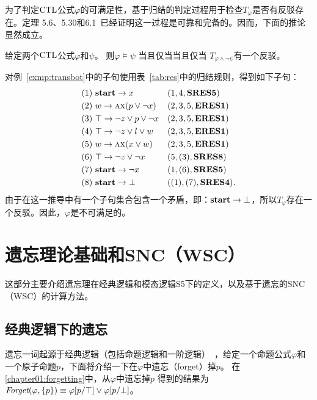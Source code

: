 为了判定$\textrm{CTL}$公式$\varphi$的可满足性，基于归结的判定过程用于检查$T_{\varphi}$是否有反驳存在。定理 5.6、5.30和6.1~\cite{zhang2014resolution}已经证明这一过程是可靠和完备的。因而，下面的推论显然成立。
\begin{corollary}
	给定两个$\textrm{CTL}$公式$\varphi$和$\psi$。 则$\varphi\models\psi$ 当且仅当当且仅当 $T_{\varphi\land\neg\psi}$有一个反驳。
\end{corollary}

\begin{example}\label{exmp:resbot}
	对例~\ref{exmp:transbot}中的子句使用表~\ref{tab:res}中的归结规则，得到如下子句：
	\begin{align*}
		&(1)\ \textbf{start} \rightarrow x  && (1, 4, \textbf{SRES5})\\
		&(2)\ w \rightarrow \textsc{a}\textsc{x} (p \vee \neg x) && (2, 3,5,\textbf{ERES1})\\
		&(3)\ \top \rightarrow  \neg z \vee p \vee \neg x  && (2, 3,5,\textbf{ERES1})\\
		&(4)\ \top \rightarrow \neg z \vee l \vee w && (2, 3,5,\textbf{ERES1})\\
		&(5)\ w \rightarrow \textsc{a} \textsc{x}(x \vee w) && (2, 3,5,\textbf{ERES1})\\
		&(6)\ \top \rightarrow \neg z \vee \neg x && (5, (3), \textbf{SRES8})\\
		&(7)\ \textbf{start} \rightarrow \neg x && (1, (6), \textbf{SRES5}) \\
		&(8)\ \textbf{start} \rightarrow \bot && ((1), (7), \textbf{SRES4}).
	\end{align*}
	由于在这一推导中有一个子句集合包含一个矛盾，即：$\textbf{start} \rightarrow \bot$，所以$T_{\varphi}$存在一个反驳。因此，$\varphi$是不可满足的。
\end{example}


\section{遗忘理论基础和SNC（WSC）}
这部分主要介绍遗忘理在经典逻辑和模态逻辑S5下的定义，以及基于遗忘的SNC（WSC）的计算方法。
\subsection{经典逻辑下的遗忘}\label{chapter:sub:proforgetting}
遗忘一词起源于经典逻辑（包括命题逻辑和一阶逻辑）~\cite{lin1994forget}，给定一个命题公式$\varphi$和一个原子命题$p$，下面将介绍一下在$\varphi$中遗忘（forget）掉$p$。
在\ref{chapter01:forgetting}中，从$\varphi$中遗忘掉$p$ 得到的结果为$\textit{Forget}(\varphi, \{p\}) \equiv \varphi[p/\top] \vee \varphi[p/\bot]$。


